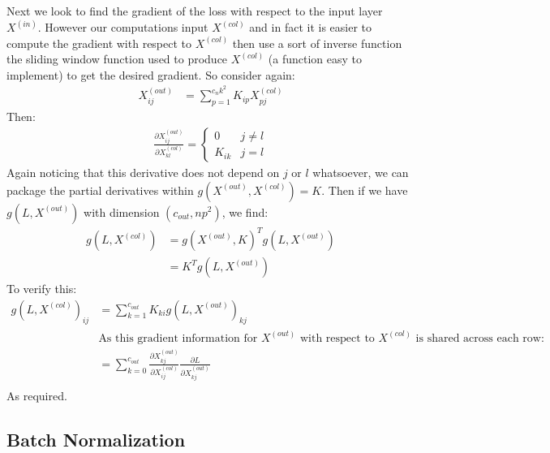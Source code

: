 \documentclass[12pt]{article}
\begin{document}
Next we look to find the gradient of the loss with respect to the input layer $X^{(in)}$.
However our computations input $X^{(col)}$ and in fact it is easier to compute the gradient
with respect to $X^{(col)}$ then use a sort of inverse function the sliding window function
used to produce $X^{(col)}$ (a function easy to implement) to get the desired gradient.
So consider again:
\begin{align*}
    X^{(out)}_{ij} &= \sum_{p = 1}^{c_nk^2}K_{ip}X^{(col)}_{pj}
\end{align*}
Then:
\begin{align*}
    \frac{\partial  X^{(out)}_{ij}}{\partial X^{(col)}_{kl}} = 
    \begin{cases}
        0 & j \neq l \\
        K_{ik} & j = l
    \end{cases}
\end{align*}
Again noticing that this derivative does not depend on $j$ or $l$ whatsoever,
we can package the partial derivatives within $g(X^{(out)}, X^{(col)}) = K$.
Then if we have $g(L, X^{(out)})$ with dimension $(c_{out}, np^2)$, we find:
\begin{align*}
    g(L, X^{(col)}) &=  g(X^{(out)}, K)^Tg(L, X^{(out)}) \\
    &= K^Tg(L, X^{(out)})
\end{align*}
To verify this:
\begin{align*}
    g(L, X^{(col)})_{ij} &= \sum_{k = 1}^{c_{out}}K_{ki}g(L, X^{(out)})_{kj} \\
    &\text{As this gradient information for $X^{(out)}$ with respect to $X^{(col)}$ is shared across each row:} \\
    &= \sum_{k = 0}^{c_{out}}\frac{\partial X^{(out)}_{kj}}{\partial X^{(col)}_{ij}}\frac{\partial L}{\partial X^{(out)}_{kj}}\\
\end{align*}
As required.

\subsection*{Batch Normalization}
\end{document}
